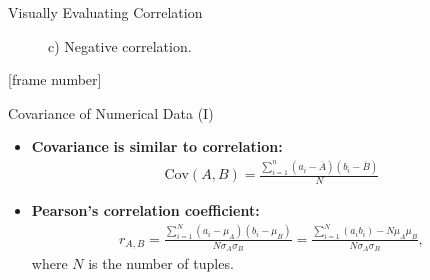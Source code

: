 \documentclass[aspectratio=169,t]{beamer}
\begin{document}
{\begin{frame}{Visually Evaluating Correlation}
\begin{figure}[H]
\begin{minipage}{0.32\textwidth}
            \caption{c) Negative correlation.}
        \end{minipage}\hfill
    \end{figure}
    \end{frame}
  }

  {
    [frame number]
    \begin{frame}{Covariance of Numerical Data (I)}
    \begin{itemize}
      \item \textbf{\color{airforceblue}Covariance} \textbf{is similar to correlation:}\\
            \begin{align}
              \text{Cov}(A,B) = \frac{\sum_{i=1}^{n}(a_i-\overline{A})(b_i-\overline{B})}{N}
            \end{align}
      \item \textbf{Pearson's correlation coefficient:}\\
            \begin{align}
              r_{A,B} = \frac{\sum_{i=1}^{N} (a_i-\mu_A)(b_i-\mu_B)}{N\sigma_A\sigma_B} = \frac{\sum_{i=1}^{N}(a_ib_i)-N\mu_A\mu_B}{N \sigma_A\sigma_B},
            \end{align}
            where $N$ is the number of tuples.
    \end{itemize}
    \end{frame}
  }
\end{document}
